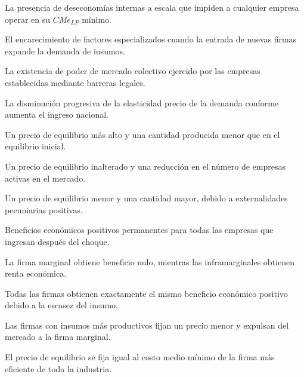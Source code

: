 \begin{opts}
    \item La presencia de deseconomías internas a escala que impiden a cualquier empresa operar en su $CMe_{LP}$ mínimo.
    \item El encarecimiento de factores especializados cuando la entrada de nuevas firmas expande la demanda de insumos.
    \item La existencia de poder de mercado colectivo ejercido por las empresas establecidas mediante barreras legales.
    \item La disminución progresiva de la elasticidad precio de la demanda conforme aumenta el ingreso nacional.
\end{opts}

\begin{opts}
    \item Un precio de equilibrio más alto y una cantidad producida menor que en el equilibrio inicial.
    \item Un precio de equilibrio inalterado y una reducción en el número de empresas activas en el mercado.
    \item Un precio de equilibrio menor y una cantidad mayor, debido a externalidades pecuniarias positivas.
    \item Beneficios económicos positivos permanentes para todas las empresas que ingresan después del choque.
\end{opts}

\begin{opts}
    \item La firma marginal obtiene beneficio nulo, mientras las inframarginales obtienen renta económica.
    \item Todas las firmas obtienen exactamente el mismo beneficio económico positivo debido a la escasez del insumo.
    \item Las firmas con insumos más productivos fijan un precio menor y expulsan del mercado a la firma marginal.
    \item El precio de equilibrio se fija igual al costo medio mínimo de la firma más eficiente de toda la industria.
\end{opts}

